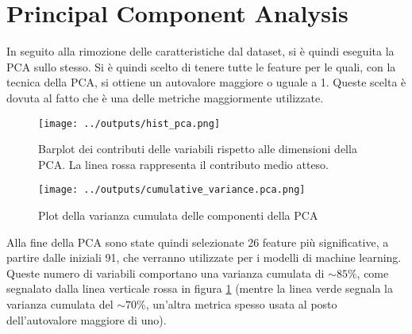 \section{Principal Component Analysis}
In seguito alla rimozione delle caratteristiche dal dataset, si è quindi eseguita la PCA 
sullo stesso. Si è quindi scelto di tenere tutte le feature per le quali, con la tecnica della PCA, 
si ottiene un autovalore maggiore o uguale a 1. 
Queste scelta è dovuta al fatto che è una delle metriche maggiormente utilizzate.
\begin{figure}[H]
    \centering
    \texttt{[image: ../outputs/hist\_pca.png]}
    \caption{Barplot dei contributi delle variabili rispetto alle dimensioni 
    della PCA. La linea rossa rappresenta il contributo medio atteso.}
\end{figure}
\begin{figure}[H]
    \centering
    \texttt{[image: ../outputs/cumulative\_variance.pca.png]}
    \caption{Plot della varianza cumulata delle componenti della PCA}
    \label{fig:var}
\end{figure}
Alla fine della PCA sono state quindi selezionate 26 feature più significative,
a partire dalle iniziali 91, che verranno utilizzate per i modelli di machine 
learning. Queste numero di variabili comportano una varianza cumulata di 
$\sim 85\%$, come segnalato dalla linea verticale rossa in figura \ref{fig:var}
(mentre la linea verde segnala la varianza cumulata del $\sim 70\%$, un'altra
metrica spesso usata al posto dell'autovalore maggiore di uno).